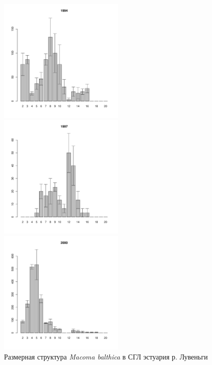 \begin{figure}[hp]
	\begin{minipage}[b]{.3\linewidth}
	\begin{center}
\includegraphics[width=60mm]{../White_Sea/Estuatiy_Luvenga/sizestr2_1994_.pdf}
	\end{center}
	\end{minipage}
	\hfill
	\begin{minipage}[b]{.3\linewidth}
	\begin{center}
	\includegraphics[width=60mm]{../White_Sea/Estuatiy_Luvenga/sizestr2_1997_.pdf}
	\end{center}
	\end{minipage}	
	\hfill
	\begin{minipage}[b]{.3\linewidth}
	\begin{center}
	\includegraphics[width=60mm]{../White_Sea/Estuatiy_Luvenga/sizestr2_2000_.pdf}
	\end{center}
	\end{minipage}
	\caption{Размерная структура {\it Macoma balthica} в СГЛ эстуария р. Лувеньги}
	\label{ris:size_str_estuary_Luv}
	\end{figure}

